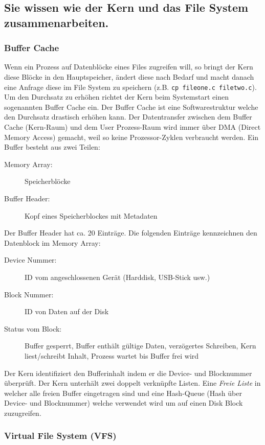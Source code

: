 \subsection{Sie wissen wie der Kern und das File System zusammenarbeiten.}

\subsubsection{Buffer Cache}

Wenn ein Prozess auf Datenblöcke eines Files zugreifen will, so bringt der Kern diese Blöcke in den Hauptspeicher, ändert diese nach Bedarf und macht danach eine Anfrage diese im File System zu speichern (z.B. \texttt{cp fileone.c filetwo.c}). Um den Durchsatz zu erhöhen richtet der Kern beim Systemstart einen sogenannten Buffer Cache ein. Der Buffer Cache ist eine Softwarestruktur welche den Durchsatz drastisch erhöhen kann. Der Datentransfer zwischen dem Buffer Cache (Kern-Raum) und dem User Prozess-Raum wird immer über DMA (Direct Memory Access) gemacht, weil so keine Prozessor-Zyklen verbraucht werden.
Ein Buffer besteht aus zwei Teilen:
\begin{description}
	\item[Memory Array:] Speicherblöcke
	\item[Buffer Header:] Kopf eines Speicherblockes mit Metadaten
\end{description} 
Der Buffer Header hat ca. 20 Einträge. Die folgenden Einträge kennzeichnen den Datenblock im Memory Array:
\begin{description}
	\item[Device Nummer:] ID vom angeschlossenen Gerät (Harddisk, USB-Stick usw.)
	\item[Block Nummer:] ID von Daten auf der Disk
	\item[Status vom Block:] Buffer gesperrt, Buffer enthält gültige Daten, verzögertes Schreiben, Kern liest/schreibt Inhalt, Prozess wartet bis Buffer frei wird
\end{description}
Der Kern identifiziert den Bufferinhalt indem er die Device- und Blocknummer überprüft. Der Kern unterhält zwei doppelt verknüpfte Listen. Eine \emph{Freie Liste} in welcher alle freien Buffer eingetragen sind und eine Hash-Queue (Hash über Device- und Blocknummer) welche verwendet wird um auf einen Disk Block zuzugreifen.

\subsubsection{Virtual File System (VFS)}

